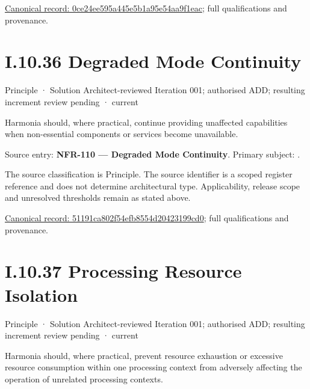 {\footnotesize \href{../../../../../../../continuum/motivation/principle/architectural-axiom/0ce24ee595a445e5b1a95e54aa9f1eac.md}{Canonical record: 0ce24ee595a445e5b1a95e54aa9f1eac}; full qualifications and provenance.}\par
\section*{I.10.36 Degraded Mode Continuity}
\label{navigation:I.10.36}

\label{element:51191ca802f54efb8554d20423199cd0}
{\small Principle · Solution Architect-reviewed Iteration 001; authorised ADD; resulting increment review pending · current}\par

Harmonia should, where practical, continue providing unaffected capabilities when non-essential components or services become unavailable.



Source entry: \textbf{NFR-110 — Degraded Mode Continuity}. Primary subject: \texttt{}.



The source classification is Principle. The source identifier is a scoped register reference and does not determine architectural type. Applicability, release scope and unresolved thresholds remain as stated above.


{\footnotesize \href{../../../../../../../continuum/motivation/principle/51191ca802f54efb8554d20423199cd0.md}{Canonical record: 51191ca802f54efb8554d20423199cd0}; full qualifications and provenance.}\par
\section*{I.10.37 Processing Resource Isolation}
\label{navigation:I.10.37}

\label{element:41ce95e00e064d809ad4bda818705510}
{\small Principle · Solution Architect-reviewed Iteration 001; authorised ADD; resulting increment review pending · current}\par

Harmonia should, where practical, prevent resource exhaustion or excessive resource consumption within one processing context from adversely affecting the operation of unrelated processing contexts.



